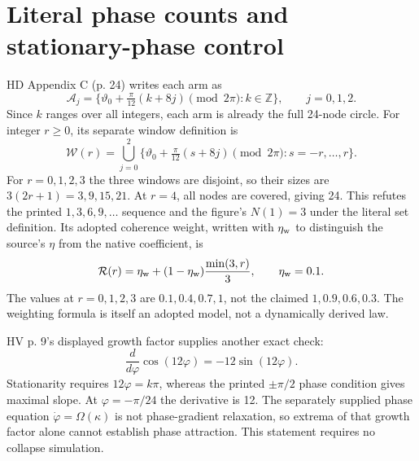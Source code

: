 \documentclass[11pt,a4paper]{article}
\numberwithin{equation}{section}
\begin{document}
\section{Literal phase counts and stationary-phase control}\label{app:counts}
HD Appendix C (p. 24) writes each arm as
\begin{equation}
 \mathcal A_j=\{\vartheta_0+\tfrac\pi{12}(k+8j)\pmod{2\pi}:k\in\mathbb Z\},\qquad j=0,1,2.
\end{equation}
Since $k$ ranges over all integers, each arm is already the full 24-node circle. For integer $r\ge0$, its separate window definition is
\begin{equation}
 \mathcal W(r)=\bigcup_{j=0}^2\{\vartheta_0+\tfrac\pi{12}(s+8j)\pmod{2\pi}:s=-r,\ldots,r\}.
\end{equation}
For $r=0,1,2,3$ the three windows are disjoint, so their sizes are $3(2r+1)=3,9,15,21$. At $r=4$, all nodes are covered, giving 24. This refutes the printed $1,3,6,9,\ldots$ sequence and the figure's $N(1)=3$ under the literal set definition. Its adopted coherence weight, written with $\eta_{\rm w}$ to distinguish the source's $\eta$ from the native coefficient, is
\begin{equation}
 \mathcal R(r)=\eta_{\rm w}+(1-\eta_{\rm w})\frac{\min(3,r)}3,\qquad\eta_{\rm w}=0.1.
\end{equation}
The values at $r=0,1,2,3$ are $0.1,0.4,0.7,1$, not the claimed $1,0.9,0.6,0.3$. The weighting formula is itself an adopted model, not a dynamically derived law.

HV p. 9's displayed growth factor supplies another exact check:
\begin{equation}
 \frac{d}{d\varphi}\cos(12\varphi)=-12\sin(12\varphi).
\end{equation}
Stationarity requires $12\varphi=k\pi$, whereas the printed $\pm\pi/2$ phase condition gives maximal slope. At $\varphi=-\pi/24$ the derivative is 12. The separately supplied phase equation $\dot\varphi=\Omega(\kappa)$ is not phase-gradient relaxation, so extrema of that growth factor alone cannot establish phase attraction. This statement requires no collapse simulation.
\end{document}
